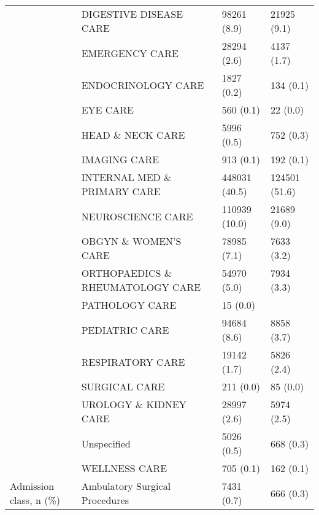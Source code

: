 \begin{tabular}{llll}
                                       & DIGESTIVE DISEASE CARE &              98261 (8.9) &       21925 (9.1) \\
                                       & EMERGENCY CARE &              28294 (2.6) &        4137 (1.7) \\
                                       & ENDOCRINOLOGY CARE &               1827 (0.2) &         134 (0.1) \\
                                       & EYE CARE &                560 (0.1) &          22 (0.0) \\
                                       & HEAD \& NECK CARE &               5996 (0.5) &         752 (0.3) \\
                                       & IMAGING CARE &                913 (0.1) &         192 (0.1) \\
                                       & INTERNAL MED \& PRIMARY CARE &            448031 (40.5) &     124501 (51.6) \\
                                       & NEUROSCIENCE CARE &            110939 (10.0) &       21689 (9.0) \\
                                       & OBGYN \& WOMEN'S CARE &              78985 (7.1) &        7633 (3.2) \\
                                       & ORTHOPAEDICS \& RHEUMATOLOGY CARE &              54970 (5.0) &        7934 (3.3) \\
                                       & PATHOLOGY CARE &                 15 (0.0) &                   \\
                                       & PEDIATRIC CARE &              94684 (8.6) &        8858 (3.7) \\
                                       & RESPIRATORY CARE &              19142 (1.7) &        5826 (2.4) \\
                                       & SURGICAL CARE &                211 (0.0) &          85 (0.0) \\
                                       & UROLOGY \& KIDNEY CARE &              28997 (2.6) &        5974 (2.5) \\
                                       & Unspecified &               5026 (0.5) &         668 (0.3) \\
                                       & WELLNESS CARE &                705 (0.1) &         162 (0.1) \\
Admission class, n (\%) & Ambulatory Surgical Procedures &               7431 (0.7) &         666 (0.3) \\

\end{tabular}
